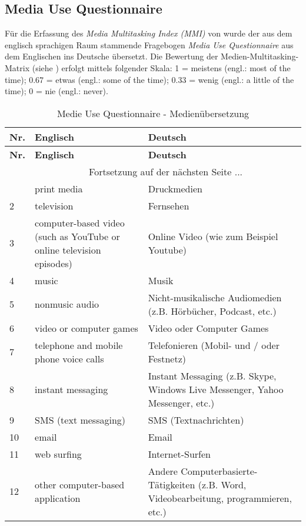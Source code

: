 \begin{RaggedRight}

\section*{Media Use Questionnaire}\label{appendix.muq}
Für die Erfassung des \textit{Media Multitasking Index (MMI)} von  wurde der aus dem englisch sprachigen Raum stammende Fragebogen \textit{Media Use Questionnaire} aus dem Englischen ins Deutsche übersetzt.
Die Bewertung der Medien-Multitasking-Matrix (siehe ) erfolgt mittels folgender Skala: 1 = meistens (engl.: most of the time); 0.67 = etwas (engl.: some of the time); 0.33 = wenig (engl.: a little of the time); 0 = nie (engl.: never).  \\

\begin{center}
    \begin{longtable}[t]{|l|p{6.6 cm}|p{6.6 cm}|}
    \caption{Medie Use Questionnaire - Medienübersetzung} \\ \hline
        \textbf{Nr.} & \textbf{Englisch} & \textbf{Deutsch} \\ \hline
        \endfirsthead
        \hline
        \textbf{Nr.} & \textbf{Englisch} & \textbf{Deutsch} \\ \hline
        \endhead 
        & \multicolumn{2}{|c|}{Fortsetzung auf der nächsten Seite $...$ } \\ \hline
        \endfoot
        \hline
        \endlastfoot
        1 & print media & Druckmedien \\
        2 & television & Fernsehen \\
        3 & computer-based video (such as YouTube or online television episodes) & Online Video (wie zum Beispiel Youtube) \\
        4 & music & Musik \\
        5 & nonmusic audio & Nicht-musikalische Audiomedien (z.B. Hörbücher, Podcast, etc.) \\
        6 & video or computer games & Video oder Computer Games \\
        7 & telephone and mobile phone voice calls & Telefonieren (Mobil- und / oder Festnetz) \\
        8 & instant messaging & Instant Messaging (z.B. Skype, Windows Live Messenger, Yahoo Messenger, etc.) \\
        9 & SMS (text messaging) & SMS (Textnachrichten) \\
        10 & email & Email \\
        11 & web surfing & Internet-Surfen \\
        12 & other computer-based application  & Andere Computerbasierte-Tätigkeiten (z.B. Word, Videobearbeitung, programmieren, etc.) \\
        \end{longtable}
	\label{tab.muqUebersetzung}
\end{center}



\end{RaggedRight}

